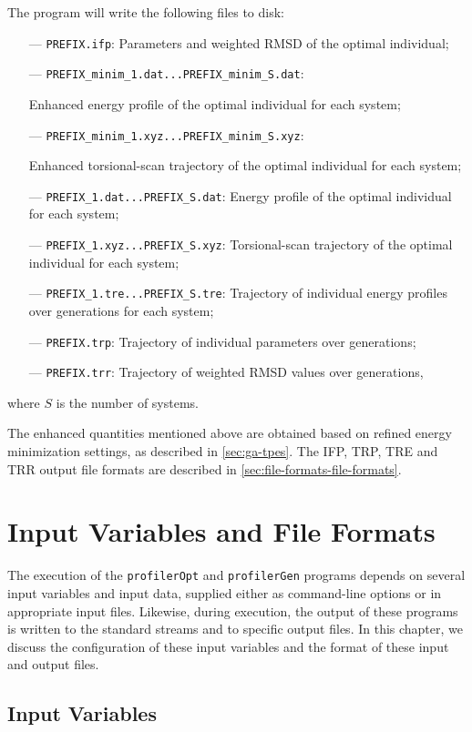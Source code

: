 \documentclass[10pt,a4paper,openany]{memoir}
\numberwithin{equation}{section}
\newcommand{\profileropt}[0]{\texttt{profilerOpt}}
\newcommand{\profilergen}[0]{\texttt{profilerGen}}
\begin{document}
The program will write the following files to disk:
\begin{itemize}
\item [---]\texttt{PREFIX.ifp}: Parameters and weighted RMSD of the optimal individual;
\item[---] \texttt{PREFIX\_minim\_1.dat...PREFIX\_minim\_S.dat}: \par Enhanced energy profile of the optimal individual for each system;
\item[---] \texttt{PREFIX\_minim\_1.xyz...PREFIX\_minim\_S.xyz}: \par Enhanced torsional-scan trajectory of the optimal individual for each system;
\item[---] \texttt{PREFIX\_1.dat...PREFIX\_S.dat}: Energy profile of the optimal individual for each system;
\item[---] \texttt{PREFIX\_1.xyz...PREFIX\_S.xyz}: Torsional-scan trajectory of the optimal individual for each system;
\item [---]\texttt{PREFIX\_1.tre...PREFIX\_S.tre}: Trajectory of individual energy profiles over generations for each system;
\item [---]\texttt{PREFIX.trp}: Trajectory of individual parameters over generations;
\item [---]\texttt{PREFIX.trr}: Trajectory of weighted RMSD values over generations,
\end{itemize}
where $S$ is the number of systems.

The enhanced quantities mentioned above are obtained based on refined
energy minimization settings, as described in \autoref{sec:ga-tpes}.
The IFP, TRP, TRE and TRR output file formats are described in
\autoref{sec:file-formats-file-formats}.

\chapter{Input Variables and File Formats}
\label{chap:file-formats}

The execution of the \profileropt{} and \profilergen{} programs
depends on several input variables and input data, supplied either as
command-line options or in appropriate input files.  Likewise, during
execution, the output of these programs is written to the standard
streams and to specific output files. In this chapter, we discuss the
configuration of these input variables and the format of these input
and output files.

\section{Input Variables}
\label{sec:file-formats-input-variables}
\end{document}
